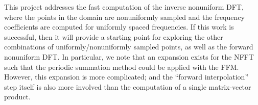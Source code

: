 \documentclass{article}
\begin{document}
This project addresses the fast computation of the inverse nonuniform
DFT, where the points in the domain are nonuniformly sampled and the
frequency coefficients are computed for uniformly spaced
frequencies. If this work is successful, then it will provide a
starting point for exploring the other combinations of
uniformly/nonuniformly sampled points, as well as the forward
nonuniform DFT. In particular, we note that an expansion exists for
the NFFT such that the periodic summation method could be applied with
the FFM. However, this expansion is more complicated; and the
``forward interpolation'' step itself is also more involved than the
computation of a single matrix-vector product.

{}

\end{document}
